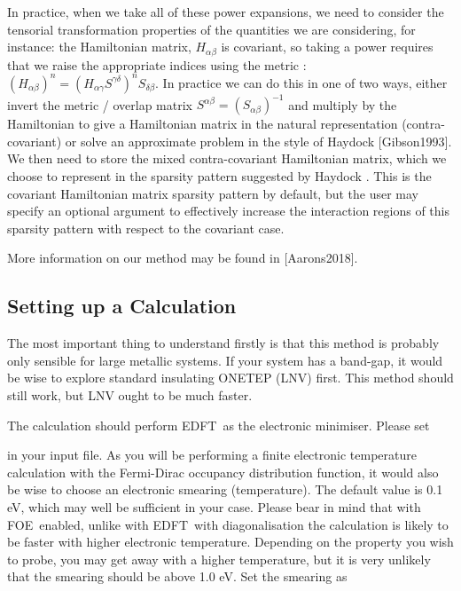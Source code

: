 \documentclass[letterpaper,10pt,english]{sphinxmanual}
\begin{document}
In practice, when we take all of these power expansions, we need to
consider the tensorial transformation properties of the quantities we
are considering, for instance: the Hamiltonian matrix,
\(H_{\alpha\beta}\) is covariant, so taking a power requires that we
raise the appropriate indices using the metric
: \((H_{\alpha\beta})^n=(H_{\alpha\gamma}S^{\gamma\delta})^{n} S_{\delta\beta}\).
In practice we can do this in one of two ways, either invert the metric
/ overlap matrix \(S^{\alpha\beta}=(S_{\alpha\beta})^{-1}\) and
multiply by the Hamiltonian to give a Hamiltonian matrix in the natural
representation (contra-covariant) or solve an approximate problem in the
style of Haydock  {[}Gibson1993{]}. We then need
to store the mixed contra-covariant Hamiltonian matrix, which we choose
to represent in the sparsity pattern suggested by Haydock . This
is the covariant Hamiltonian matrix sparsity pattern by default, but the
user may specify an optional argument to effectively increase the
interaction regions of this sparsity pattern with respect to the
covariant case.

More information on our method may be found in
{[}Aarons2018{]}.


\subsection{Setting up a Calculation}
\label{\detokenize{AQUA-FOE:setting-up-a-calculation}}
The most important thing to understand firstly is that this method is
probably only sensible for large metallic systems. If your system has a
band-gap, it would be wise to explore standard insulating ONETEP (LNV)
first. This method should still work, but LNV ought to be much faster.

The calculation should perform EDFT as the electronic minimiser. Please
set

%
\begin{sphinxVerbatim}[commandchars=\\\{\}]
  
\end{sphinxVerbatim}

in your input file. As you will be performing a finite electronic
temperature calculation with the Fermi-Dirac occupancy distribution
function, it would also be wise to choose an electronic smearing
(temperature). The default value is 0.1 eV, which may well be sufficient
in your case. Please bear in mind that with FOE enabled, unlike with
EDFT with diagonalisation the calculation is likely to be faster with
higher electronic temperature. Depending on the property you wish to
probe, you may get away with a higher temperature, but it is very
unlikely that the smearing should be above 1.0 eV. Set the smearing as
\end{document}
